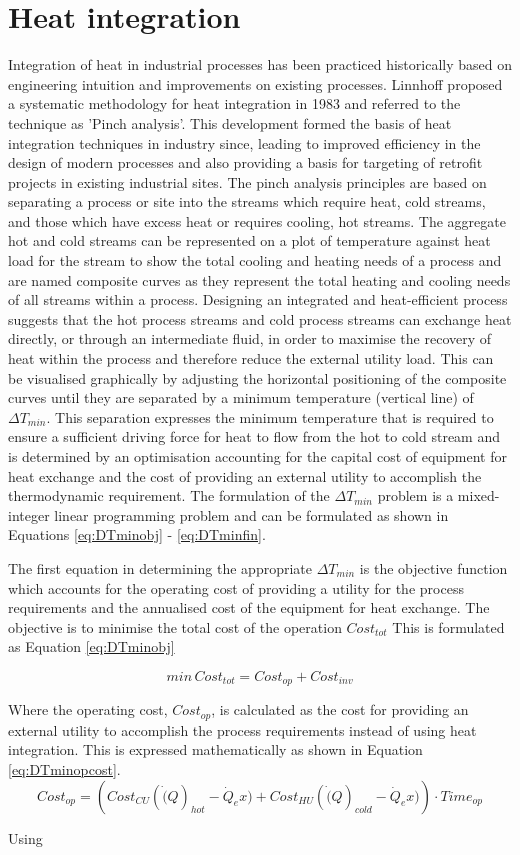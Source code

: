 
\section{Heat integration}
Integration of heat in industrial processes has been practiced historically based on engineering intuition and improvements on existing processes. Linnhoff proposed a systematic methodology for heat integration in 1983 and referred to the technique as 'Pinch analysis'. This development formed the basis of heat integration techniques in industry since, leading to improved efficiency in the design of modern processes and also providing a basis for targeting of retrofit projects in existing industrial sites. The pinch analysis principles are based on separating a process or site into the streams which require heat, cold streams, and those which have excess heat or requires cooling, hot streams. The aggregate hot and cold streams can be represented on a plot of temperature against heat load for the stream to show the total cooling and heating needs of a process and are named composite curves as they represent the total heating and cooling needs of all streams within a process. Designing an integrated and heat-efficient process suggests that the hot process streams and cold process streams can exchange heat directly, or through an intermediate fluid, in order to maximise the recovery of heat within the process and therefore reduce the external utility load. This can be visualised graphically by adjusting the horizontal positioning of the composite curves until they are separated by a minimum temperature (vertical line) of $\Delta T_{min}$. This separation expresses the minimum temperature that is required to ensure a sufficient driving force for heat to flow from the hot to cold stream and is determined by an optimisation accounting for the capital cost of equipment for heat exchange and the cost of providing an external utility to accomplish the thermodynamic requirement. The formulation of the $\Delta T_{min}$ problem is a mixed-integer linear programming problem and can be formulated as shown in Equations \ref{eq:DTminobj} - \ref{eq:DTminfin}.

The first equation in determining the appropriate $\Delta T_{min}$ is the objective function which accounts for the operating cost of providing a utility for the process requirements and the annualised cost of the equipment for heat exchange. The objective is to minimise the total cost of the operation $Cost_{tot}$ This is formulated as Equation \ref{eq:DTminobj}

\begin{equation}\label{eq:DTminobj}
min \, Cost_{tot}= Cost_{op}+Cost_{inv}
\end{equation}

Where the operating cost, $Cost_{op}$, is calculated as the cost for providing an external utility to accomplish the process requirements instead of using heat integration. This is expressed mathematically as shown in Equation \ref{eq:DTminopcost}.
\begin{equation}\label{eq:DTminopcost}
Cost_{op}=\left(Cost_{CU} (\dot(Q)_{hot}-\dot{Q}_ex)+ Cost_{HU} (\dot(Q)_{cold}-\dot{Q}_ex)\right) \cdot Time_{op}
\end{equation}

Using 